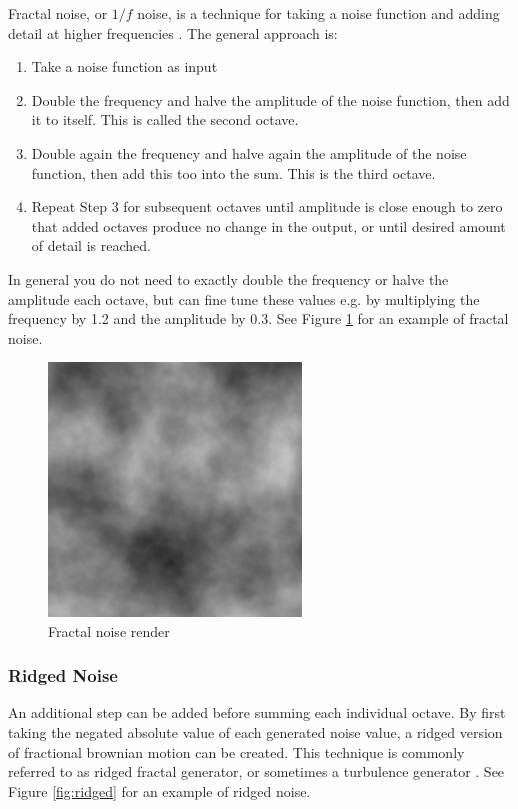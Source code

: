 Fractal noise, or \(1/f\) noise, is a technique for taking a noise function and adding detail at higher frequencies \cite{perlin}.
The general approach is:
\begin{enumerate}
\item Take a noise function as input
\item Double the frequency and halve the amplitude of the noise function, then add it to itself. This is called the second octave.
\item Double again the frequency and halve again the amplitude of the noise function, then add this too into the sum. This is the third octave.
\item Repeat Step 3 for subsequent octaves until amplitude is close enough to zero that added octaves produce no change in the output, or until desired amount of detail is reached.
\end{enumerate}

In general you do not need to exactly double the frequency or halve the amplitude each octave, but can fine tune these values e.g. by multiplying the frequency by 1.2 and the amplitude by 0.3.
See Figure \ref{fig:fbm1} for an example of fractal noise.

\begin{figure}
	\centering
		\includegraphics[width=0.6\textwidth]{figures/fbm1}
	\caption{Fractal noise render}
	\label{fig:fbm1}
\end{figure}

\subsubsection{Ridged Noise}

An additional step can be added before summing each individual octave.
By first taking the negated absolute value of each generated noise value, a ridged version of fractional brownian motion can be created.
This technique is commonly referred to as ridged fractal generator, or sometimes a turbulence generator \cite{perlin}.
See Figure \ref{fig:ridged} for an example of ridged noise.

